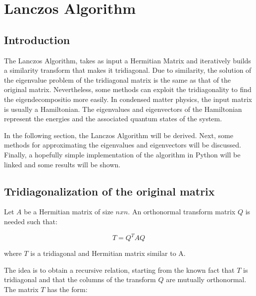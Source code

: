 \section{Lanczos Algorithm}
\label{app:lanczos}

\subsection{Introduction}

The Lanczos Algorithm, takes as input a Hermitian Matrix and iteratively builds a similarity transform that makes it tridiagonal. Due to similarity, the solution of the eigenvalue problem of the tridiagonal matrix is the same as that of the original matrix. Nevertheless, some methods can exploit the tridiagonality to find the eigendecompositio more easily. In condensed matter physics, the input matrix is usually a Hamiltonian. The eigenvalues and eigenvectors of the Hamiltonian represent the energies and the associated quantum states of the system. 

In the following section, the Lanczos Algorithm will be derived. Next, some methods for approximating the eigenvalues and eigenvectors will be discussed. Finally, a hopefully simple implementation of the algorithm in Python will be linked and some results will be shown.

\subsection{Tridiagonalization of the original matrix}

Let $A$ be a Hermitian matrix of size $nxn$. An orthonormal transform matrix $Q$ is needed such that:

\[ T = Q^{T}AQ \]

where $T$ is a tridiagonal and Hermitian matrix similar to A.

The idea is to obtain a recursive relation, starting from the known fact that $T$ is tridiagonal and that the columns of the transform $Q$ are mutually orthonormal. The matrix $T$ has the form:

